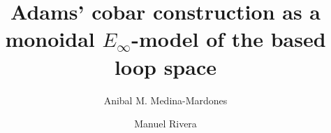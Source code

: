 \documentclass{amsart}
\title[Adams' cobar construction as a monoidal $E_{\infty}$-model]{Adams' cobar construction as a monoidal $E_{\infty}$-model of the based loop space}
\author[A. Medina-Mardones]{Anibal M. Medina-Mardones}
\author[M. Rivera]{Manuel Rivera}
\begin{document}
	
	\maketitle
	\tableofcontents
	
	
	
%	
%	
	
%	
	
%	
	\todos
	\sloppy
    \printbibliography
\end{document}
